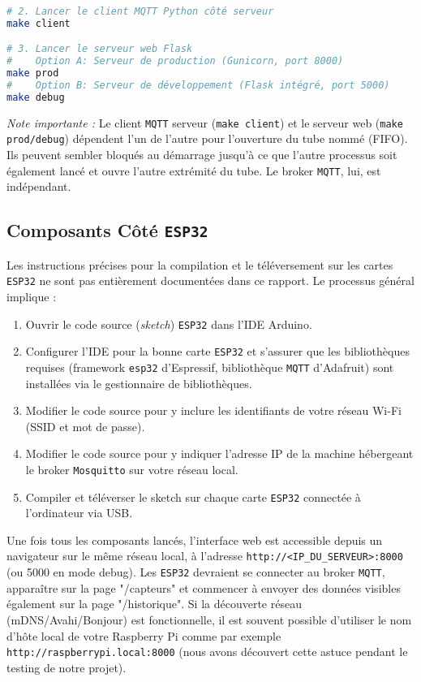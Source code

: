 \documentclass[12pt]{article}
\begin{document}
\begin{enumerate}
\begin{lstlisting}[language=bash]
# 2. Lancer le client MQTT Python côté serveur
make client

# 3. Lancer le serveur web Flask
#    Option A: Serveur de production (Gunicorn, port 8000)
make prod
#    Option B: Serveur de développement (Flask intégré, port 5000)
make debug
        \end{lstlisting}
        \textit{Note importante :} Le client \texttt{MQTT} serveur (\texttt{make client}) et le serveur web (\texttt{make prod/debug}) dépendent l'un de l'autre pour l'ouverture du tube nommé (FIFO). Ils peuvent sembler bloqués au démarrage jusqu'à ce que l'autre processus soit également lancé et ouvre l'autre extrémité du tube. Le broker \texttt{MQTT}, lui, est indépendant.
\end{enumerate}

\subsection{Composants Côté \texttt{ESP32}}

Les instructions précises pour la compilation et le téléversement sur les cartes \texttt{ESP32} ne sont pas entièrement documentées dans ce rapport. Le processus général implique :
\begin{enumerate}
    \item Ouvrir le code source (\textit{sketch}) \texttt{ESP32} dans l'IDE Arduino.
    \item Configurer l'IDE pour la bonne carte \texttt{ESP32} et s'assurer que les bibliothèques requises (framework \texttt{esp32} d'Espressif, bibliothèque \texttt{MQTT} d'Adafruit) sont installées via le gestionnaire de bibliothèques.
    \item Modifier le code source pour y inclure les identifiants de votre réseau Wi-Fi (SSID et mot de passe).
    \item Modifier le code source pour y indiquer l'adresse IP de la machine hébergeant le broker \texttt{Mosquitto} sur votre réseau local.
    \item Compiler et téléverser le sketch sur chaque carte \texttt{ESP32} connectée à l'ordinateur via USB.
\end{enumerate}

Une fois tous les composants lancés, l'interface web est accessible depuis un navigateur sur le même réseau local, à l'adresse \texttt{http://<IP\_DU\_SERVEUR>:8000} (ou 5000 en mode debug). Les \texttt{ESP32} devraient se connecter au broker \texttt{MQTT}, apparaître sur la page "/capteurs" et commencer à envoyer des données visibles également sur la page "/historique". Si la découverte réseau (mDNS/Avahi/Bonjour) est fonctionnelle, il est souvent possible d'utiliser le nom d'hôte local de votre Raspberry Pi comme par exemple \texttt{http://raspberrypi.local:8000} (nous avons découvert cette astuce pendant le testing de notre projet).
\end{document}
